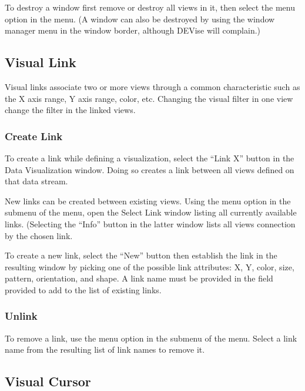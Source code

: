 To destroy a window first remove or destroy all views in it, then select the 
menu option in the  menu. (A window can also be destroyed by
using the window manager menu in the window border, although DEVise will
complain.)


\subsection{Visual Link}

Visual links associate two or more views through a common characteristic such as
the X axis range, Y axis range, color, etc. Changing the visual filter in one
view change the filter in the linked views.

\subsubsection{Create Link}

To create a link while defining a visualization, select the ``Link X'' button in
the Data Visualization window. Doing so creates a link between all views defined
on that data stream.

New links can be created between existing views. Using the  menu
option in the  submenu of the  menu, open the Select Link
window listing all currently available links. (Selecting the ``Info'' button in
the latter window lists all views connection by the chosen link.

To create a new link, select the ``New'' button then establish the link in the
resulting window by picking one of the possible link attributes: X, Y, color,
size, pattern, orientation, and shape. A link name must be provided in the field
provided to add to the list of existing links.

\subsubsection{Unlink}

To remove a link, use the  menu option in the  submenu
of the  menu. Select a link name from the resulting list of link names
to remove it.


\subsection{Visual Cursor}


